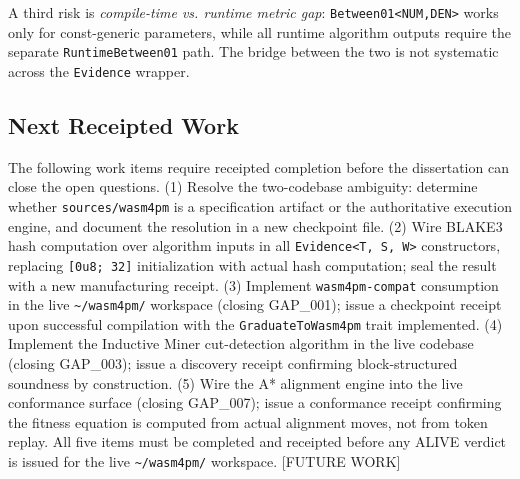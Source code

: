 A third risk is \emph{compile-time vs. runtime metric gap}: \texttt{Between01<NUM,DEN>} works
only for const-generic parameters, while all runtime algorithm outputs require the separate
\texttt{RuntimeBetween01} path. The bridge between the two is not systematic across the
\texttt{Evidence} wrapper.

\subsection{Next Receipted Work}
\label{sec:sources-wasm4pm-gaps-next-work}

The following work items require receipted completion before the dissertation can close the
open questions. (1) Resolve the two-codebase ambiguity: determine whether \texttt{sources/wasm4pm}
is a specification artifact or the authoritative execution engine, and document the resolution in
a new checkpoint file. (2) Wire BLAKE3 hash computation over algorithm inputs in all
\texttt{Evidence<T,~S,~W>} constructors, replacing \texttt{[0u8;~32]} initialization with
actual hash computation; seal the result with a new manufacturing receipt. (3) Implement
\texttt{wasm4pm-compat} consumption in the live \texttt{\textasciitilde/wasm4pm/} workspace
(closing GAP\_001); issue a checkpoint receipt upon successful compilation with the
\texttt{GraduateToWasm4pm} trait implemented. (4) Implement the Inductive Miner cut-detection
algorithm in the live codebase (closing GAP\_003); issue a discovery receipt confirming
block-structured soundness by construction. (5) Wire the A* alignment engine into the live
conformance surface (closing GAP\_007); issue a conformance receipt confirming the fitness
equation is computed from actual alignment moves, not from token replay. All five items must
be completed and receipted before any ALIVE verdict is issued for the live
\texttt{\textasciitilde/wasm4pm/} workspace. [FUTURE WORK]
